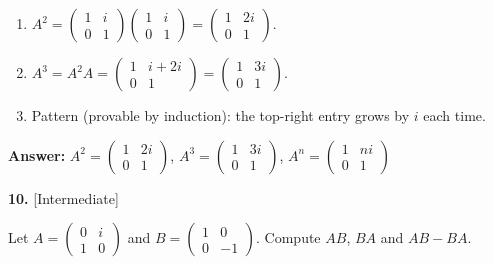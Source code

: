 \documentclass[11pt]{article}
\begin{document}
\begin{tcolorbox}[breakable,colback=ans,colframe=ansb,boxrule=0.5pt,left=4pt,right=4pt,top=2pt,bottom=2pt]\begin{enumerate}[leftmargin=2.2em,itemsep=1pt,topsep=1pt,label=\textbf{Step \arabic*.}]\item $A^{2}=\begin{pmatrix}1&i\\0&1\end{pmatrix}\begin{pmatrix}1&i\\0&1\end{pmatrix}=\begin{pmatrix}1&2i\\0&1\end{pmatrix}$.
\item $A^{3}=A^{2}A=\begin{pmatrix}1&i+2i\\0&1\end{pmatrix}=\begin{pmatrix}1&3i\\0&1\end{pmatrix}$.
\item Pattern (provable by induction): the top-right entry grows by $i$ each time.
\end{enumerate}\textbf{Answer:} $A^{2}=\begin{pmatrix}1&2i\\0&1\end{pmatrix}$, $A^{3}=\begin{pmatrix}1&3i\\0&1\end{pmatrix}$, $A^{n}=\begin{pmatrix}1&ni\\0&1\end{pmatrix}$\end{tcolorbox}
\par\vspace{2pt}
\begin{minipage}{\linewidth}\textbf{10.} \hfill{\scriptsize\color{ink}[Intermediate]}\par\nopagebreak Let $A=\begin{pmatrix}0&i\\1&0\end{pmatrix}$ and $B=\begin{pmatrix}1&0\\0&-1\end{pmatrix}$. Compute $AB$, $BA$ and $AB-BA$.
\end{minipage}\par\nopagebreak
\end{document}
